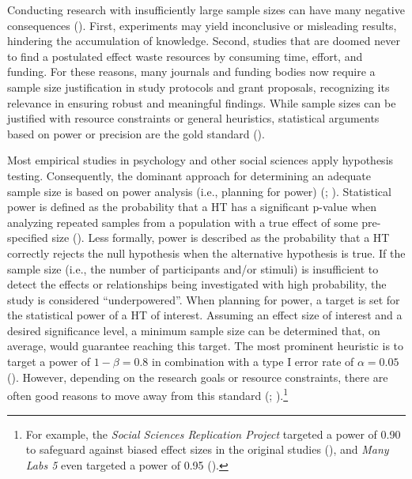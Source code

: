\documentclass[
  man,
  floatsintext,
  longtable,
  a4paper,
  nolmodern,
  notxfonts,
  notimes,
  colorlinks=true,linkcolor=blue,citecolor=blue,urlcolor=blue]{apa7}
\begin{document}
Conducting research with insufficiently large sample sizes can have many
negative consequences (). First, experiments may yield inconclusive or misleading
results, hindering the accumulation of knowledge. Second, studies that
are doomed never to find a postulated effect waste resources by
consuming time, effort, and funding. For these reasons, many journals
and funding bodies now require a sample size justification in study
protocols and grant proposals, recognizing its relevance in ensuring
robust and meaningful findings. While sample sizes can be justified with
resource constraints or general heuristics, statistical arguments based
on power or precision are the gold standard
().

Most empirical studies in psychology and other social sciences apply
hypothesis testing. Consequently, the dominant approach for determining
an adequate sample size is based on power analysis (i.e., planning for
power) (;
).
Statistical power is defined as the probability that a HT has a
significant p-value when analyzing repeated samples from a population
with a true effect of some pre-specified size
(). Less formally, power
is described as the probability that a HT correctly rejects the null
hypothesis when the alternative hypothesis is true. If the sample size
(i.e., the number of participants and/or stimuli) is insufficient to
detect the effects or relationships being investigated with high
probability, the study is considered ``underpowered''. When planning for
power, a target is set for the statistical power of a HT of interest.
Assuming an effect size of interest and a desired significance level, a
minimum sample size can be determined that, on average, would guarantee
reaching this target. The most prominent heuristic is to target a power
of \(1- \beta = 0.8\) in combination with a type I error rate of
\(\alpha = 0.05\)
().
However, depending on the research goals or resource constraints, there
are often good reasons to move away from this standard
(; ).\footnote{For example, the \emph{Social Sciences Replication
  Project} targeted a power of 0.90 to safeguard against biased effect
  sizes in the original studies
  (), and \emph{Many Labs 5} even targeted a power of 0.95
  ().}
\end{document}
